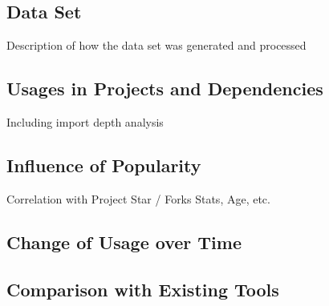 
\subsection{Data Set}\label{subsec:go-geiger:evaluation:data-set}

Description of how the data set was generated and processed



\subsection{Usages in Projects and Dependencies}\label{subsec:go-geiger:evaluation:unsafe-usage}

Including import depth analysis







\subsection{Influence of Popularity}\label{subsec:go-geiger:evaluation:popularity}

Correlation with Project Star / Forks Stats, Age, etc.



\subsection{Change of Usage over Time}\label{subsec:go-geiger:evaluation:over-time}



\subsection{Comparison with Existing Tools}\label{subsec:go-geiger:evaluation:linters-comparison}

